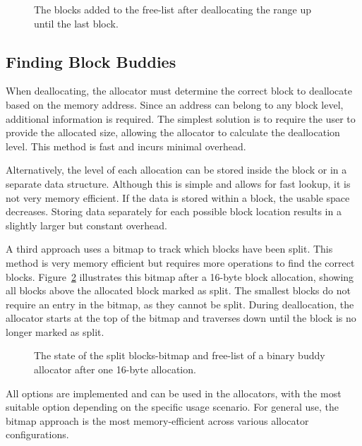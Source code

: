 \begin{figure}[h]
    \centering
    
    \caption{The blocks added to the free-list after deallocating the range up until the last block.}
    \label{fig:deallocrange}
\end{figure}

\subsection{Finding Block Buddies} \label{sec:findbuddiesexpl}
When deallocating, the allocator must determine the correct block to deallocate based on the memory address. Since an address can belong to any block level, additional information is required. The simplest solution is to require the user to provide the allocated size, allowing the allocator to calculate the deallocation level. This method is fast and incurs minimal overhead.

Alternatively, the level of each allocation can be stored inside the block or in a separate data structure. Although this is simple and allows for fast lookup, it is not very memory efficient. If the data is stored within a block, the usable space decreases. Storing data separately for each possible block location results in a slightly larger but constant overhead.

A third approach uses a bitmap to track which blocks have been split. This method is very memory efficient but requires more operations to find the correct blocks. Figure~\ref{fig:buddybmapsplit} illustrates this bitmap after a 16-byte block allocation, showing all blocks above the allocated block marked as split. The smallest blocks do not require an entry in the bitmap, as they cannot be split. During deallocation, the allocator starts at the top of the bitmap and traverses down until the block is no longer marked as split.

\begin{figure}[h]
    \centering
    
    \caption{The state of the split blocks-bitmap and free-list of a binary buddy allocator after one 16-byte allocation.}
    \label{fig:buddybmapsplit}
\end{figure}

All options are implemented and can be used in the allocators, with the most suitable option depending on the specific usage scenario. For general use, the bitmap approach is the most memory-efficient across various allocator configurations.

